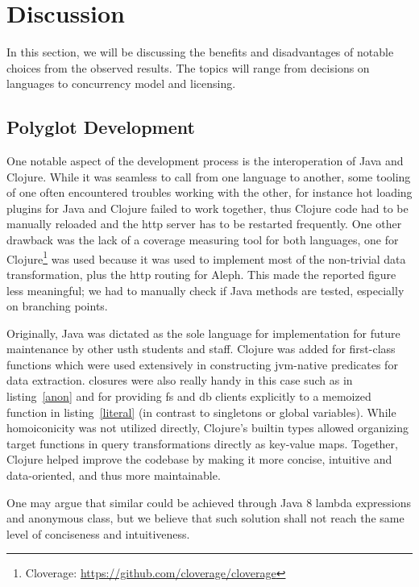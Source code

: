 \section{Discussion}
In this section, we will be discussing the benefits and disadvantages
of notable choices from the observed results.  The topics will range
from decisions on languages to concurrency model and licensing.

\subsection{Polyglot Development}
One notable aspect of the development process is the interoperation of Java
and Clojure.  While it was seamless to call from one language to another,
some tooling of one often encountered troubles working with the other,
for instance hot loading plugins for Java and Clojure failed to work together,
thus Clojure code had to be manually reloaded and the \gls{http} server
has to be restarted frequently.  One other drawback was the lack of a coverage
measuring tool for both languages, one for Clojure\footnote{Cloverage:
\url{https://github.com/cloverage/cloverage}} was used because it was used
to implement most of the non-trivial data transformation, plus the \gls{http}
routing for Aleph.  This made the reported figure less meaningful; we had
to manually check if Java methods are tested, especially on branching points.

Originally, Java was dictated as the sole language for implementation
for future maintenance by other \gls{usth} students and staff.  Clojure
was added for first-class functions which were used extensively in constructing
\gls{jvm}-native predicates for data extraction.  \Glspl{closure} were also
really handy in this case such as in listing~\ref{anon} and for providing
\gls{fs} and \gls{db} clients explicitly to a memoized function
in listing~\ref{literal} (in contrast to singletons or global variables).
While \gls{homoiconicity} was not utilized directly, Clojure's builtin types
allowed organizing target functions in query transformations directly
as key-value maps.  Together, Clojure helped improve the codebase by making it
more concise, intuitive and data-oriented, and thus more maintainable.

One may argue that similar could be achieved through Java 8 lambda expressions
and anonymous class, but we believe that such solution shall not reach
the same level of conciseness and intuitiveness.

